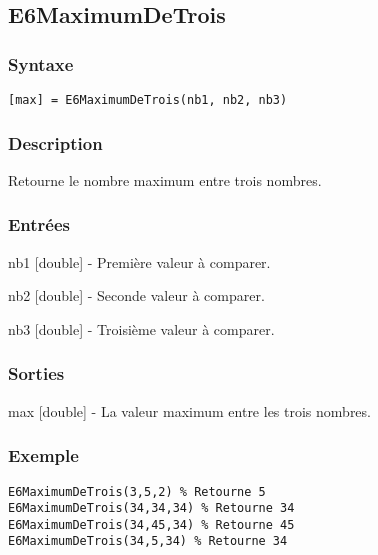 \begin{minipage}{\linewidth}
\subsection*{E6MaximumDeTrois}
\subsubsection*{Syntaxe}
\begin{lstlisting}
[max] = E6MaximumDeTrois(nb1, nb2, nb3)
\end{lstlisting}
\subsubsection*{Description}
Retourne le nombre maximum entre trois nombres.
\subsubsection*{Entrées}
\begin{description}
\item nb1 [double] - Première valeur à comparer. 
\item nb2 [double] - Seconde valeur à comparer. 
\item nb3 [double] - Troisième valeur à comparer. 
\end{description} \subsubsection*{Sorties}
\begin{description}
\item max [double] - La valeur maximum entre les trois nombres. 
\end{description} 
\subsubsection*{Exemple}
\begin{lstlisting}
E6MaximumDeTrois(3,5,2) % Retourne 5 
E6MaximumDeTrois(34,34,34) % Retourne 34 
E6MaximumDeTrois(34,45,34) % Retourne 45 
E6MaximumDeTrois(34,5,34) % Retourne 34
\end{lstlisting} \medskip
\end{minipage}